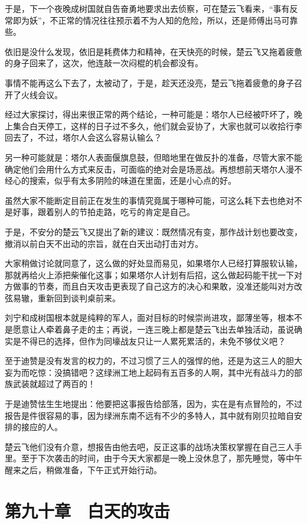 于是，下一个夜晚成树国就自告奋勇地要求出去侦察，可在楚云飞看来，“事有反常即为妖”，不正常的情况往往预示着不为人知的危险，所以，还是师傅出马可靠些。

依旧是没什么发现，依旧是耗费体力和精神，在天快亮的时候，楚云飞又拖着疲惫的身子回来了，这次，他连敲一次闷棍的机会都没有。

事情不能再这么下去了，太被动了，于是，趁天还没亮，楚云飞拖着疲惫的身子召开了火线会议。

经过大家探讨，得出来很正常的两个结论，一种可能是：塔尔人已经被吓坏了，晚上集合白天停工，这样的日子过不多久，他们就会妥协了，大家也就可以收拾行李回去了，不过，塔尔人会这么容易认输么？

另一种可能就是：塔尔人表面偃旗息鼓，但暗地里在做反扑的准备，尽管大家不能确定他们会用什么方式来反击，可面临的绝对会是场恶战。再想想前天塔尔人漫不经心的搜索，似乎有太多阴险的味道在里面，还是小心点的好。

虽然大家不能断定目前正在发生的事情究竟属于哪种可能，可这么耗下去也绝对不是好事，跟着别人的节拍走路，吃亏的肯定是自己。

于是，不安分的楚云飞又提出了新的建议：既然情况有变，那作战计划也要改变，撤消以前白天不出动的宗旨，就在白天出动打击对方。

大家稍做讨论就同意了，这么做的好处显而易见，如果塔尔人已经打算服软认输，那就再给火上添把柴催化这事；如果塔尔人计划有后招，这么做起码能干扰一下对方做事的节奏，而且白天攻击更表现了自己这方的决心和果敢，没准还能叫对方改弦易辙，重新回到谈判桌前来。

刘宁和成树国根本就是纯粹的军人，面对目标的时候崇尚进攻，鄙薄坐等，根本不是愿意让人牵着鼻子走的主；再说，一连三晚上都是楚云飞出去单独活动，虽说确实是不得已的选择，但作为同壕战友只让一人累死累活的，未免不够仗义吧？

至于迪赞是没有发言的权力的，不过习惯了三人的强悍的他，还是为这三人的胆大妄为而吃惊：没搞错吧？这绿洲工地上起码有五百多的人啊，其中光有战斗力的部族武装就超过了两百的！

于是迪赞怯生生地提出：他要把这事报告给部落，因为，实在是有点冒险的，不过报告是件很容易的事，因为绿洲东南不远有不少的多特人，其中就有刚贝拉暗自安排的接应的人。

楚云飞他们没有介意，想报告由他去吧，反正这事的战场决策权掌握在自己三人手里。至于下次袭击的时间，由于今天大家都是一晚上没休息了，那先睡觉，等中午醒来之后，稍做准备，下午正式开始行动。

\section{第九十章　白天的攻击}

